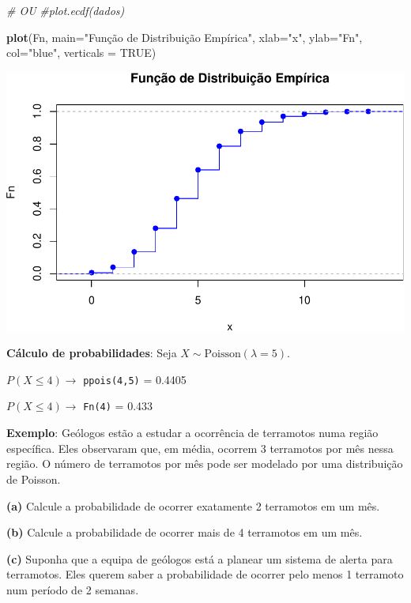 \documentclass[
]{book}
\newenvironment{Shaded}{\begin{snugshade}}{\end{snugshade}}
\newcommand{\AttributeTok}[1]{\textcolor[rgb]{0.13,0.29,0.53}{#1}}
\newcommand{\CommentTok}[1]{\textcolor[rgb]{0.56,0.35,0.01}{\textit{#1}}}
\newcommand{\ConstantTok}[1]{\textcolor[rgb]{0.56,0.35,0.01}{#1}}
\newcommand{\FunctionTok}[1]{\textcolor[rgb]{0.13,0.29,0.53}{\textbf{#1}}}
\newcommand{\NormalTok}[1]{#1}
\newcommand{\StringTok}[1]{\textcolor[rgb]{0.31,0.60,0.02}{#1}}
\begin{document}
\begin{Shaded}
\begin{Highlighting}[]
\CommentTok{\# OU}
\CommentTok{\#plot.ecdf(dados)}

\FunctionTok{plot}\NormalTok{(Fn, }\AttributeTok{main=}\StringTok{"Função de Distribuição Empírica"}\NormalTok{,}
     \AttributeTok{xlab=}\StringTok{"x"}\NormalTok{,}
     \AttributeTok{ylab=}\StringTok{"Fn"}\NormalTok{,}
     \AttributeTok{col=}\StringTok{"blue"}\NormalTok{,}
     \AttributeTok{verticals =} \ConstantTok{TRUE}\NormalTok{)}
\end{Highlighting}
\end{Shaded}

\includegraphics{introR_files/figure-latex/unnamed-chunk-256-2.pdf}

\textbf{Cálculo de probabilidades}: Seja \(X\sim\text{Poisson}(\lambda=5)\).

\(P(X\leq 4) \to\) \texttt{ppois(4,5)} = 0.4405

\(P(X \leq 4) \to\) \texttt{Fn(4)} = 0.433

\textbf{Exemplo}: Geólogos estão a estudar a ocorrência de terramotos numa região específica. Eles observaram que, em média, ocorrem 3 terramotos por mês nessa região. O número de terramotos por mês pode ser modelado por uma distribuição de Poisson.

\textbf{(a)} Calcule a probabilidade de ocorrer exatamente 2 terramotos em um mês.

\textbf{(b)} Calcule a probabilidade de ocorrer mais de 4 terramotos em um mês.

\textbf{(c)} Suponha que a equipa de geólogos está a planear um sistema de alerta para terramotos. Eles querem saber a probabilidade de ocorrer pelo menos 1 terramoto num período de 2 semanas.
\end{document}
